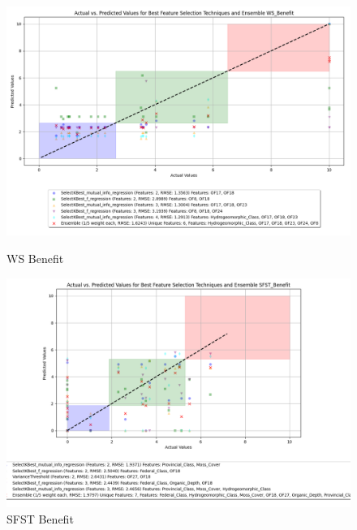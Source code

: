 \begin{figure}[H]
    \centering
    \begin{minipage}{0.45\textwidth}
        \centering
        \includegraphics[width=\linewidth]{reg_section_specxtra/images_reg_featred_ensemble/actual_vs_predicted_smallest_feature_selection_and_ensemble_WS_Benefit.png}
        \caption{WS Benefit}
        \label{fig_reg_specxtra:ws_ben_reg_featred_smallest_ensemble}
    \end{minipage}\hfill
    \begin{minipage}{0.45\textwidth}
        \centering
        \includegraphics[width=\linewidth]{reg_section_specxtra/images_reg_featred_ensemble/actual_vs_predicted_smallest_feature_selection_and_ensemble_SFST_Benefit.png}
        \caption{SFST Benefit}
        \label{fig_reg_specxtra:sfst_ben_reg_featred_smallest_ensemble}
    \end{minipage}
\end{figure}